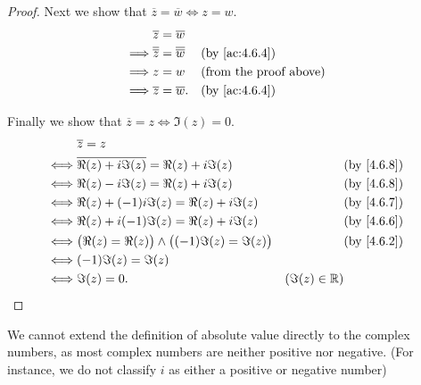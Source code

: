 \begin{proof}
  Next we show that \(\overline{z} = \overline{w} \iff z = w\).
  \begin{align*}
             & \overline{z} = \overline{w}                                                          \\
    \implies & \overline{\overline{z}} = \overline{\overline{w}} &  & \text{(by \cref{ac:4.6.4})}   \\
    \implies & z = w                                             &  & \text{(from the proof above)} \\
    \implies & \overline{z} = \overline{w}.                      &  & \text{(by \cref{ac:4.6.4})}
  \end{align*}

  Finally we show that \(\overline{z} = z \iff \Im(z) = 0\).
  \begin{align*}
         & \overline{z} = z                                                                                            \\
    \iff & \overline{\Re(z) + i \Im(z)} = \Re(z) + i \Im(z)               &                 & \text{(by \cref{4.6.8})} \\
    \iff & \Re(z) - i \Im(z) = \Re(z) + i \Im(z)                          &                 & \text{(by \cref{4.6.8})} \\
    \iff & \Re(z) + (-1) i \Im(z) = \Re(z) + i \Im(z)                     &                 & \text{(by \cref{4.6.7})} \\
    \iff & \Re(z) + i (-1) \Im(z) = \Re(z) + i \Im(z)                     &                 & \text{(by \cref{4.6.6})} \\
    \iff & \big(\Re(z) = \Re(z)\big) \land \big((-1) \Im(z) = \Im(z)\big) &                 & \text{(by \cref{4.6.2})} \\
    \iff & (-1) \Im(z) = \Im(z)                                                                                        \\
    \iff & \Im(z) = 0.                                                    & (\Im(z) \in \R)
  \end{align*}
\end{proof}

\begin{note}
  We cannot extend the definition of absolute value directly to the complex numbers, as most complex numbers are neither positive nor negative.
  (For instance, we do not classify \(i\) as either a positive or negative number)
\end{note}

